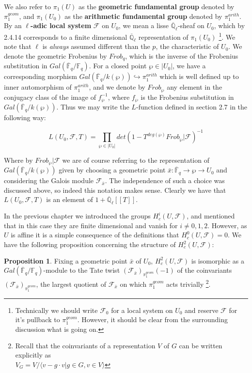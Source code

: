 \documentclass{ucbthesis}
\theoremstyle{definition}
\theoremstyle{theorem}
\newtheorem{prop}[thm]{Proposition}
\begin{document}
We also refer to $\pi_{1}(U)$ as the \textbf{geometric fundamental group} denoted by $\pi_{1}^{geom}$, and $\pi_{1}(U_0)$ as the \textbf{arithmetic fundamental group} denoted by $\pi_{1}^{arith}$. By an \textbf{$\ell$-adic local system} $\mathcal{F}$ on $U_{0}$, we mean a lisse $\overline{\mathbb{Q}}_{\ell}$-sheaf on  $U_{0}$, which by 2.4.14 corresponds to a finite dimensional $\overline{\mathbb{Q}}_{\ell}$ representation of $\pi_{1}(U_{0})$
\footnote{Technically we should write $\mathcal{F}_{0}$ for a local system on $U_{0}$ and reserve $\mathcal{F}$ for it's pullback to $\pi_{1}^{geom}$. However, it should be clear from the surrounding discussion what is going on.}. We note that $\ell$ is \emph{always} assumed different than the $p$, the characteristic of $U_0$. We denote the geometric Frobenius by $Frob_{q}$, which is the inverse of the Frobenius substitution in $Gal(\overline{\mathbb{F}}_{q}/\mathbb{F}_{q})$. For a closed point $\wp \in |U_{0}|$, we have a corresponding morphism $Gal(\overline{\mathbb{F}}_{q}/k(\wp)) \hookrightarrow \pi_{1}^{arith}$ which is well defined up to inner automorphism of $\pi_{1}^{arith}$, and we denote by $Frob_{\wp}$ any element in the conjugacy class of the image of $f_{\wp}^{-1}$, where  $f_{\wp}$ is the Frobenius substitution in $Gal(\overline{\mathbb{F}}_{q}/k(\wp))$. Thus we may write the $L$-function defined in section 2.7 in the following way:

$$L(U_{0},\mathcal{F},T) = \prod\limits_{\wp \in |U_{0}|}det(1-T^{deg(\wp)}Frob_{\wp}|\mathcal{F})^{-1}$$

Where by $Frob_{\wp}|\mathcal{F}$ we are of course referring to the representation of  $Gal(\overline{\mathbb{F}}_{q}/k(\wp))$ given by choosing a geometric point $\bar{x}:\overline{\mathbb{F}}_{q} \rightarrow \wp \rightarrow U_{0}$ and considering the Galois module $\mathcal{F}_{\bar{x}}$. The independence of such a choice was discussed above, so indeed this notation makes sense. Clearly we have that $L(U_{0},\mathcal{F},T)$ is an element of $1+\overline{\mathbb{Q}}_{\ell}[[T]]$. 

In the previous chapter we introduced the groups $H^{i}_{c}(U,\mathcal{F})$, and mentioned that in this case they are finite dimensional and vanish for $i\neq 0,1,2$. However, as $U$ is affine it is a simple consequence of the definitions that $H_{c}^{0}(U,\mathcal{F}) = 0$. We have the following proposition concerning the structure of $H^{2}_{c}(U,\mathcal{F})$:

\begin{prop}
Fixing a geometric point $\bar{x}$ of  $U_{0}$, $H^{2}_{c}(U,\mathcal{F})$ is isomorphic as a $Gal(\overline{\mathbb{F}}_{q}/\mathbb{F}_{q})$-module to the Tate twist $(\mathcal{F}_{\bar{x}})_{\pi_{1}^{geom}}(-1)$ of the coinvariants $(\mathcal{F}_{\bar{x}})_{\pi_{1}^{geom}}$, the largest quotient of $\mathcal{F}_{\bar{x}}$ on which $\pi_{1}^{geom}$ acts trivially
\footnote{Recall that the coinvariants of a representation $V$ of $G$ can be written explicitly as \\ $V_{G} = V/\langle v-g\cdot v| g\in G, v\in V\rangle$}.
\end{prop}
\end{document}
